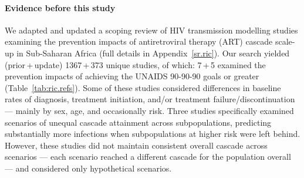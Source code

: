 \newcommand{\pu}[2]{#1\,+\,#2}
\begin{ric}
  \paragraph{Evidence before this study}
  We adapted and updated a scoping review of HIV transmission modelling studies examining
  the prevention impacts of antiretroviral therapy (ART) cascade scale-up in Sub-Saharan Africa
  (full details in Appendix~\ref{sr.ric}).
  Our search yielded (\pu{prior}{update}) \pu{1367}{373} unique studies, of which:
  \pu{7}{5} examined the prevention impacts of achieving
  the UNAIDS 90-90-90 goals or greater (Table~\ref{tab:ric.refs}).
  Some of these studies considered differences in baseline rates of
  diagnosis, treatment initiation, and/or treatment failure/discontinuation
  --- mainly by sex, age, and occasionally risk.
  Three studies specifically examined scenarios of unequal cascade attainment across subpopulations,
  predicting substantially more infections when subpopulations at higher risk were left behind.
    However, these studies did not maintain consistent overall cascade across scenarios
  --- \ie each scenario reached a different cascade for the population overall ---
  and considered only hypothetical scenarios.

\end{ric}
